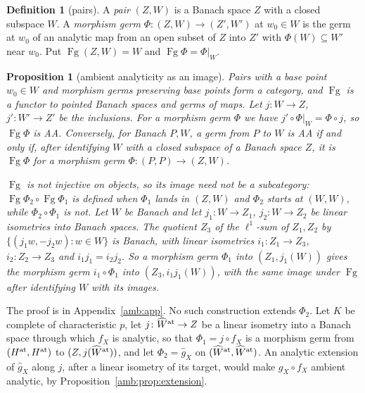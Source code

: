\documentclass[11pt]{amsart}
\newtheorem{proposition}[theorem]{Proposition}
\theoremstyle{definition}
\newtheorem{definition}[theorem]{Definition}
\theoremstyle{remark}
\numberwithin{equation}{section}
\theoremstyle{plain}
\theoremstyle{definition}
\theoremstyle{plain}
\begin{document}
\begin{definition}[pairs]\label{amb:def:pairs}
A \emph{pair} $(Z,W)$ is a Banach space $Z$ with a closed subspace $W$. A \emph{morphism germ} $\Phi\colon(Z,W)\to(Z',W')$ at $w_0\in W$ is the germ at $w_0$ of an analytic map from an open subset of $Z$ into $Z'$ with $\Phi(W)\subseteq W'$ near $w_0$. Put $\operatorname{Fg}(Z,W)=W$ and $\operatorname{Fg}\Phi=\Phi|_W$.
\end{definition}

\begin{proposition}[ambient analyticity as an image]\label{amb:prop:pairs}
Pairs with a base point $w_0\in W$ and morphism germs preserving base points form a category, and $\operatorname{Fg}$ is a functor to pointed Banach spaces and germs of maps. Let $j\colon W\to Z$, $j'\colon W'\to Z'$ be the inclusions. For a morphism germ $\Phi$ we have $j'\circ\Phi|_W=\Phi\circ j$, so $\operatorname{Fg}\Phi$ is AA. Conversely, for Banach $P,W$, a germ from $P$ to $W$ is AA if and only if, after identifying $W$ with a closed subspace of a Banach space $Z$, it is $\operatorname{Fg}\Phi$ for a morphism germ $\Phi\colon(P,P)\to(Z,W)$.

$\operatorname{Fg}$ is not injective on objects, so its image need not be a subcategory: $\operatorname{Fg}\Phi_2\circ\operatorname{Fg}\Phi_1$ is defined when $\Phi_1$ lands in $(Z,W)$ and $\Phi_2$ starts at $(W,W)$, while $\Phi_2\circ\Phi_1$ is not. Let $W$ be Banach and let $j_1\colon W\to Z_1$, $j_2\colon W\to Z_2$ be linear isometries into Banach spaces. The quotient $Z_3$ of the $\ell^1$-sum of $Z_1,Z_2$ by $\{(j_1w,-j_2w):w\in W\}$ is Banach, with linear isometries $i_1\colon Z_1\to Z_3$, $i_2\colon Z_2\to Z_3$ and $i_1j_1=i_2j_2$. So a morphism germ $\Phi_1$ into $(Z_1,j_1(W))$ gives the morphism germ $i_1\circ\Phi_1$ into $(Z_3,i_1j_1(W))$, with the same image under $\operatorname{Fg}$ after identifying $W$ with its images.
\end{proposition}
The proof is in Appendix~\ref{amb:app}. No such construction extends $\Phi_2$. Let $K$ be complete of characteristic $p$, let $j\colon\widehat W^{\rm at}\to Z$ be a linear isometry into a Banach space through which $f_X$ is analytic, so that $\Phi_1=j\circ f_X$ is a morphism germ from $(H^{\rm at},H^{\rm at})$ to $(Z,j(\widehat W^{\rm at}))$, and let $\Phi_2=\hat g_X$ on $(\widehat W^{\rm at},\widehat W^{\rm at})$. An analytic extension of $\hat g_X$ along $j$, after a linear isometry of its target, would make $g_X\circ f_X$ ambient analytic, by Proposition~\ref{amb:prop:extension}.
\end{document}
